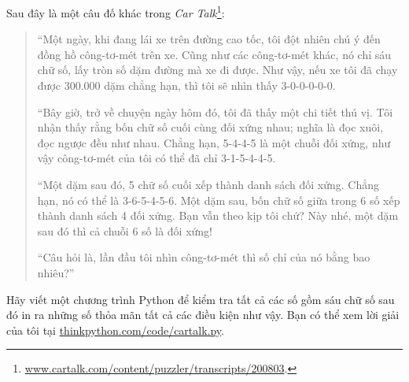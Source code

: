 \documentclass[11pt]{book}
\begin{document}
\begin{ex}
Sau đây là một câu đố khác trong {\em Car Talk}\footnote{\url{www.cartalk.com/content/puzzler/transcripts/200803}.}:


\begin{quote}
``Một ngày, khi đang lái xe trên đường cao tốc, tôi đột nhiên chú ý
đến đồng hồ công-tơ-mét trên xe. Cũng như các công-tơ-mét khác, nó chỉ
sáu chữ số, lấy tròn số dặm đường mà xe đi được. Như vậy, nếu xe tôi
đã chạy được 300.000 dặm chẳng hạn, thì tôi sẽ nhìn thấy  3-0-0-0-0-0.

``Bây giờ, trở về chuyện ngày hôm đó, tôi đã thấy một chi tiết thú vị.
Tôi nhận thấy rằng bốn chữ số cuối cùng đối xứng nhau; nghĩa là đọc
xuôi, đọc ngược đều như nhau. Chẳng hạn, 5-4-4-5 là một chuỗi đối xứng,
như vậy công-tơ-mét của tôi có thể đã chỉ 3-1-5-4-4-5.

``Một dặm sau đó, 5 chữ số cuối xếp thành danh sách đối xứng. Chẳng hạn, nó
có thể là 3-6-5-4-5-6. Một dặm sau, bốn chữ số giữa trong 6 số 
xếp thành danh sách 4 đối xứng. Bạn vẫn theo kịp tôi chứ? Này nhé, một dặm
sau đó thì cả chuỗi 6 số là đối xứng!

``Câu hỏi là, lần đầu tôi nhìn công-tơ-mét thì số chỉ của nó bằng
bao nhiêu?''
\end{quote}

Hãy viết một chương trình Python để kiểm tra tất cả các số gồm sáu
chữ số sau đó in ra những số thỏa mãn tất cả các điều kiện như vậy. 
Bạn có thể xem lời giải của tôi tại \url{thinkpython.com/code/cartalk.py}.

\end{ex}
\end{document}
